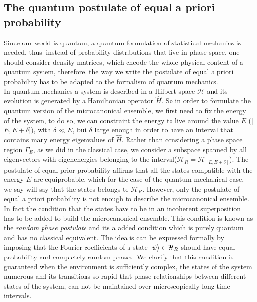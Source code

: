\subsection{The quantum postulate of equal a priori probability}
Since our world is quantum, a quantum formulation of statistical mechanics is needed, thus, instead of probability distributions that live in phase space, one should consider density matrices, which encode the whole physical content of a quantum system, therefore, the way we write the postulate of equal a priori probability has to be adapted to the formalism of quantum mechanics.\\

\indent In quantum mechanics a system is described in a Hilbert space $\mathcal{H}$ and its evolution is generated by a Hamiltonian operator $\hat{H}$. So in order to formulate the quantum version of the microcanonical ensemble, we first need to fix the energy of the system, to do so, we can constraint the energy to live around the value $E$ ([$E,E+\delta$]), with $\delta\ll E$, but $\delta$ large enough in order to have an interval that contains many energy eigenvalues of $\hat{H}$. Rather than considering a phase space region $\Gamma_{E}$, as we did in the classical case, we consider a subspace spanned by all eigenvectors with eigenenergies belonging to the interval($\mathcal{H}_{R}=\mathcal{H}_{[E,E+\delta]}$). The postulate of equal prior probability affirms that all the states compatible with the energy $E$ are equiprobable, which for the case of the quantum mechanical case, we say will say that the states belongs to $\mathcal{H}_R$. However, only the postulate of equal a priori probability is not enough to describe the microcanonical ensemble. In fact the condition that the states have to be in an incoherent superposition has to be added to build the microcanonical ensemble. This condition is known as the \textit{random phase postulate} and its a added condition which is purely quantum and has no classical equivalent. The idea is can be expressed formally by imposing that the Fourier coefficients of a state $\mathinner{|{\psi}\rangle}\in \mathcal{H}_{R}$ should have equal probability and completely random phases. We clarify that this condition is guaranteed when the environment is sufficiently complex, the states of the system numerous and its transitions so rapid that phase relationships between different states of the system, can not be maintained over microscopically long time intervals\cite{huang_statistical_1987}.\\



